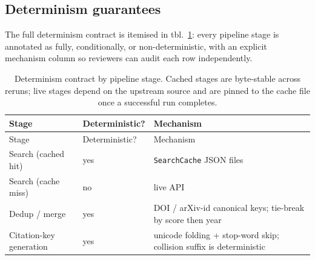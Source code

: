 \documentclass[
]{article}
\begin{document}
\subsection{Determinism guarantees}\label{determinism-guarantees}

The full determinism contract is itemised in tbl.~\ref{tbl:determinism}:
every pipeline stage is annotated as fully, conditionally, or
non-deterministic, with an explicit mechanism column so reviewers can
audit each row independently.

\begin{longtable}[]{@{}
  >{\raggedright\arraybackslash}p{}
  >{\raggedright\arraybackslash}p{}
  >{\raggedright\arraybackslash}p{}@{}}
\caption{Determinism contract by pipeline stage. Cached stages are
byte-stable across reruns; live stages depend on the upstream source and
are pinned to the cache file once a successful run
completes.}\label{tbl:determinism}\tabularnewline
\toprule\noalign{}
\begin{minipage}[b]{\linewidth}\raggedright
Stage
\end{minipage} & \begin{minipage}[b]{\linewidth}\raggedright
Deterministic?
\end{minipage} & \begin{minipage}[b]{\linewidth}\raggedright
Mechanism
\end{minipage} \\
\midrule\noalign{}
\endfirsthead
\toprule\noalign{}
\begin{minipage}[b]{\linewidth}\raggedright
Stage
\end{minipage} & \begin{minipage}[b]{\linewidth}\raggedright
Deterministic?
\end{minipage} & \begin{minipage}[b]{\linewidth}\raggedright
Mechanism
\end{minipage} \\
\midrule\noalign{}
\endhead
\bottomrule\noalign{}
\endlastfoot
Search (cached hit) & yes & \texttt{SearchCache} JSON files \\
Search (cache miss) & no & live API \\
Dedup / merge & yes & DOI / arXiv-id canonical keys; tie-break by score
then year \\
Citation-key generation & yes & unicode folding + stop-word skip;
collision suffix is deterministic \\

\end{longtable}
\end{document}
